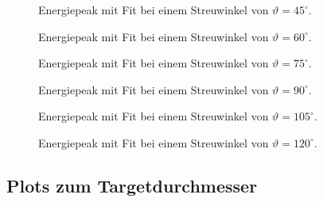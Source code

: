 \documentclass[slug=CS, room=Andreas-Schubert-Bau\,\ Labor\ 406,
supervisor=Juliane\ Volkmer, coursedate=29.\ 11.\ 2019]{../../Lab_Report_LaTeX/lab_report}
\begin{document}
\begin{figure}[H]\centering
  
  \caption{Energiepeak mit Fit bei einem Streuwinkel von \(\vartheta = 45^\circ\).}
  \label{fig:45}
\end{figure}

\begin{figure}[H]\centering
  
  \caption{Energiepeak mit Fit bei einem Streuwinkel von \(\vartheta = 60^\circ\).}
  \label{fig:60}
\end{figure}

\begin{figure}[H]\centering
  
  \caption{Energiepeak mit Fit bei einem Streuwinkel von \(\vartheta = 75^\circ\).}
  \label{fig:75}
\end{figure}

\begin{figure}[H]\centering
  
  \caption{Energiepeak mit Fit bei einem Streuwinkel von \(\vartheta = 90^\circ\).}
  \label{fig:90}
\end{figure}

\begin{figure}[H]\centering
  
  \caption{Energiepeak mit Fit bei einem Streuwinkel von \(\vartheta = 105^\circ\).}
  \label{fig:105}
\end{figure}

\begin{figure}[H]\centering
  
  \caption{Energiepeak mit Fit bei einem Streuwinkel von \(\vartheta = 120^\circ\).}
  \label{fig:120}
\end{figure}

\subsection{Plots zum Targetdurchmesser}
\label{sec:andiplot}

\begin{figure}[H]\centering
  
  \caption{}
  \label{fig:dicke-2}
\end{figure}

\begin{figure}[H]\centering
  
  \caption{}
  \label{fig:dicke-4}
\end{figure}
\end{document}
